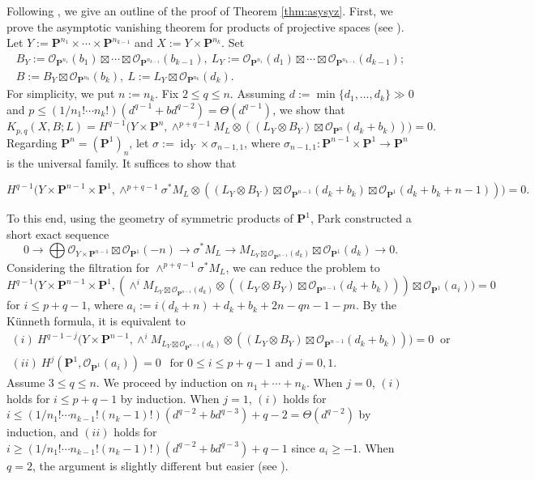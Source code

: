 \documentclass[graybox]{svmult}
\newcommand{\sO}{\mathscr{O}}
\def\nP{\mathbf{P}}
\def\id{\operatorname{id}}
\begin{document}
Following \cite{Park1, Park3}, we give an outline of the proof of Theorem \ref{thm:asysyz}. First, we prove the asymptotic vanishing theorem for products of projective spaces (see \cite[Subsection 3.2]{Park1}). Let $Y:=\nP^{n_1} \times \cdots \times \nP^{n_{k-1}}$ and $X:=Y \times \nP^{n_k}$. Set 
$$
\begin{array}{l}
B_Y:=\sO_{\nP^{n_1}}(b_1) \boxtimes \cdots \boxtimes \sO_{\nP^{n_{k-1}}}(b_{k-1}),~ L_Y:=\sO_{\nP^{n_1}}(d_1) \boxtimes \cdots \boxtimes \sO_{\nP^{n_{k-1}}}(d_{k-1});\\
B:=B_Y \boxtimes \sO_{\nP^{n_k}}(b_k),~L:=L_Y \boxtimes \sO_{\nP^{n_k}}(d_k).
\end{array}
$$ 
For simplicity, we put $n:=n_k$. Fix $2 \leq q \leq n$. Assuming $d:=\min\{d_1, \ldots, d_k\} \gg 0$ and $p \leq (1/n_1! \cdots n_k!)(d^{q-1}+bd^{q-2}) = \Theta(d^{q-1})$, we show that
$$
K_{p,q}(X, B;L) = H^{q-1}\big(Y \times \nP^n, \wedge^{p+q-1}M_{L} \otimes ((L_Y \otimes B_Y) \boxtimes \sO_{\nP^n}(d_k+b_k))\big) = 0.
$$
Regarding $\nP^n=(\nP^1)_n$, let $\sigma:=\id_Y \times \sigma_{n-1,1}$, where $\sigma_{n-1,1} \colon \nP^{n-1} \times \nP^1 \to \nP^n$ is the universal family. It suffices to show that\\[-20pt]

\begin{small}
$$
H^{q-1}\big(Y \times \nP^{n-1} \times \nP^1, \wedge^{p+q-1}\sigma^* M_{L} \otimes ((L_Y\otimes B_Y) \boxtimes \sO_{\nP^{n-1}}(d_k+b_k) \boxtimes \sO_{\nP^1}(d_k+b_k+n-1))\big)=0.
$$
\end{small}

\noindent To this end, using the geometry of symmetric products of $\nP^1$, Park \cite[Subsection 3.1]{Park1} constructed a short exact sequence
$$
0 \longrightarrow  \bigoplus \sO_{Y \times \nP^{n-1}} \boxtimes \sO_{\nP^1}(-n) \longrightarrow  \sigma^* M_{L} \longrightarrow  M_{L_Y \boxtimes \sO_{\nP^{n-1}}(d_k)} \boxtimes \sO_{\nP^1}(d_k) \longrightarrow  0.
$$
Considering the filtration for $\wedge^{p+q-1}\sigma^* M_{L}$, we can reduce the problem to
$$
H^{q-1}\big(Y \times \nP^{n-1} \times \nP^1, (\wedge^i M_{L_Y \boxtimes \sO_{\nP^{n-1}}(d_k)} \otimes ((L_Y \otimes B_Y) \boxtimes \sO_{\nP^{n-1}}(d_k+b_k))) \boxtimes \sO_{\nP^1}(a_i) \big)= 0
$$
for $i \leq p+q-1$, where $a_i:= i(d_k+n) + d_k + b_k +2n-qn -1 -pn$.
By the K\"{u}nneth formula, it is equivalent to 
$$
\begin{array}{l}
(i)~H^{q-1-j}\big(Y \times \nP^{n-1}, \wedge^i M_{L_Y \boxtimes \sO_{\nP^{n-1}}(d_k)} \otimes ((L_Y \otimes B_Y) \boxtimes \sO_{\nP^{n-1}}(d_k+b_k))\big) = 0~\text{ or }\\
(ii)~H^j(\nP^1,  \sO_{\nP^1}(a_i))=0~~\text{ for $0 \leq i \leq p+q-1$ and $j=0,1$}.
\end{array}
$$
Assume $3 \leq q \leq n$. We proceed by induction on $n_1 + \cdots + n_k$. When $j=0$, $(i)$ holds for $i \leq p+q-1$ by induction. When $j=1$, $(i)$ holds for $i \leq (1/n_1! \cdots n_{k-1}!(n_k-1)!)(d^{q-2}+bd^{q-3})+q-2=\Theta(d^{q-2})$ by induction, and $(ii)$ holds for $i \geq (1/n_1! \cdots n_{k-1}!(n_k-1)!)(d^{q-2}+bd^{q-3})+q-1$ since $a_i \geq -1$. When $q=2$, the argument is slightly different but easier (see \cite[Subsection 3.2]{Park1}).
\end{document}
